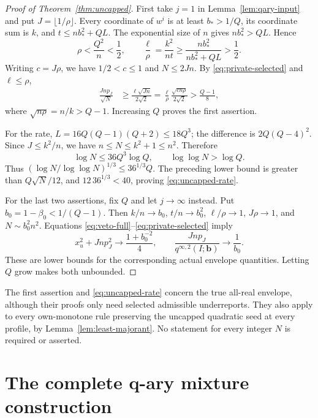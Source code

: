 \documentclass[11pt]{article}
\theoremstyle{definition}
\theoremstyle{remark}
\begin{document}
\begin{proof}[Proof of Theorem~\ref{thm:uncapped}]
First take $j=1$ in Lemma~\ref{lem:qary-input} and put
$J=\lfloor1/\rho\rfloor$.  Every coordinate of $w^i$ is at least
$b_*>1/Q$, its coordinate sum is $k$, and
$t\le nb_*^2+QL$.  The exponential size of $n$ gives
$nb_*^2>QL$.  Hence
\[
 \rho<\frac{Q^2}{n}<\frac12,
 \qquad
 \frac\ell\rho=\frac{k^2}{nt}
       \ge\frac{nb_*^2}{nb_*^2+QL}>\frac12.
\]
Writing $c=J\rho$, we have $1/2<c\le1$ and $N\le2Jn$.  By
\eqref{eq:private-selected} and $\ell\le\rho$,
\begin{align*}
 \frac{Jn p_J}{\sqrt N}
 &\ge\frac{\ell\sqrt{Jn}}{2\sqrt2}
  =\frac{\ell}{\rho}\frac{\sqrt{c n\rho}}{2\sqrt2}
  >\frac{Q-1}{8},
\end{align*}
where $\sqrt{n\rho}=n/k>Q-1$.  Increasing $Q$ proves the first assertion.

For the rate, $L=16Q(Q-1)(Q+2)\le18Q^3$; the difference is
$2Q(Q-4)^2$.  Since $J\le k^2/n$, we have $n\le N\le k^2+1\le n^2$.
Therefore
\[
 \log N\le36Q^3\log Q,
 \qquad \log\log N>\log Q.
\]
Thus $(\log N/\log\log N)^{1/3}\le36^{1/3}Q$.
The preceding lower bound is greater than $Q\sqrt N/12$, and
$12\,36^{1/3}<40$, proving \eqref{eq:uncapped-rate}.

For the last two assertions, fix $Q$ and let $j\to\infty$ instead.
Put $b_0=1-\beta_0<1/(Q-1)$.  Then
$k/n\to b_0$, $t/n\to b_0^2$, $\ell/\rho\to1$,
$J\rho\to1$, and $N\sim b_0^2n^2$.  Equations
\eqref{eq:veto-full}--\eqref{eq:private-selected} imply
\[
 x_u^2+Jn p_J^2\longrightarrow\frac{1+b_0^{-2}}4,
 \qquad
 \frac{Jn p_J}{q^{\infty,2}(I;\mathbf b)}\longrightarrow\frac1{b_0}.
\]
These are lower bounds for the corresponding actual envelope quantities.
Letting $Q$ grow makes both unbounded.
\end{proof}

The first assertion and \eqref{eq:uncapped-rate} concern the true
all-real envelope, although their proofs only need selected admissible
underreports.  They also apply to every own-monotone rule preserving
the uncapped quadratic seed at every profile, by
Lemma~\ref{lem:least-majorant}.  No statement for every integer $N$ is
required or asserted.

\appendix
\section{The complete q-ary mixture construction}
\label{app:qary}
\end{document}
